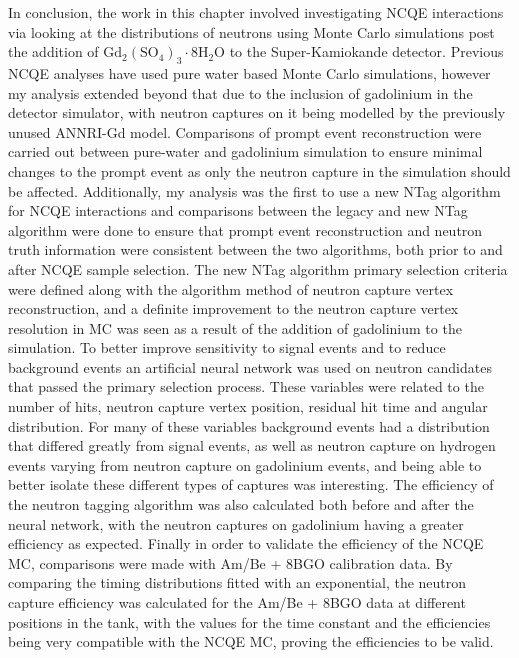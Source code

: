 In conclusion, the work in this chapter involved investigating NCQE interactions via looking at the distributions of neutrons using Monte Carlo simulations post the addition of $\mathrm{Gd}_{2}\left(\mathrm{SO}_{4}\right)_{3} \cdot 8 \mathrm{H}_{2} \mathrm{O}$ to the Super-Kamiokande detector. Previous NCQE analyses have used pure water based Monte Carlo simulations, however my analysis extended beyond that due to the inclusion of gadolinium in the detector simulator, with neutron captures on it being modelled by the previously unused ANNRI-Gd model. Comparisons of prompt event reconstruction were carried out between pure-water and gadolinium simulation to ensure minimal changes to the prompt event as only the neutron capture in the simulation should be affected. Additionally, my analysis was the first to use a new NTag algorithm for NCQE interactions and comparisons between the legacy and new NTag algorithm were done to ensure that prompt event reconstruction and neutron truth information were consistent between the two algorithms, both prior to and after NCQE sample selection. The new NTag algorithm primary selection criteria were defined along with the algorithm method of neutron capture vertex reconstruction, and a definite improvement to the neutron capture vertex resolution in MC was seen as a result of the addition of gadolinium to the simulation. 
\newline
To better improve sensitivity to signal events and to reduce background events an artificial neural network was used on neutron candidates that passed the primary selection process. These variables were related to the number of hits, neutron capture vertex position, residual hit time and angular distribution. For many of these variables background events had a distribution that differed greatly from signal events, as well as neutron capture on hydrogen events varying from neutron capture on gadolinium events, and being able to better isolate these different types of captures was interesting. The efficiency of the neutron tagging algorithm was also calculated both before and after the neural network, with the neutron captures on gadolinium having a greater efficiency as expected. 
\newline
Finally in order to validate the efficiency of the NCQE MC, comparisons were made with Am/Be + 8BGO calibration data. By comparing the timing distributions fitted with an exponential, the neutron capture efficiency was calculated for the Am/Be + 8BGO data at different positions in the tank, with the values for the time constant and the efficiencies being very compatible with the NCQE MC, proving the efficiencies to be valid.